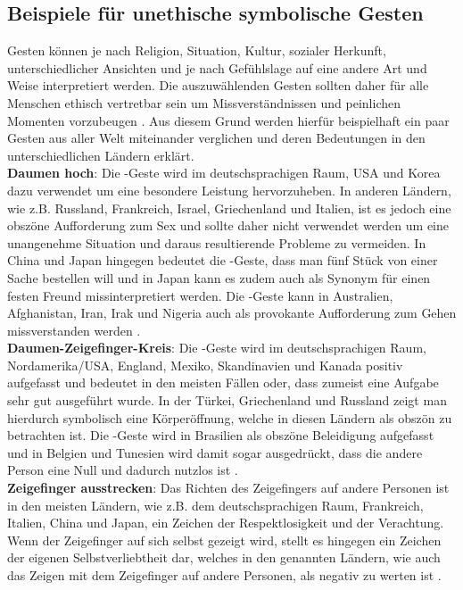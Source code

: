 \subsection{Beispiele für unethische symbolische Gesten}
Gesten können je nach Religion, Situation, Kultur, sozialer Herkunft, unterschiedlicher Ansichten und je nach Gefühlslage auf eine andere Art und Weise interpretiert werden. Die auszuwählenden Gesten sollten daher für alle Menschen ethisch vertretbar sein um Missverständnissen und peinlichen Momenten vorzubeugen \cite{gesten_liste_2020}. Aus diesem Grund werden hierfür beispielhaft ein paar Gesten aus aller Welt miteinander verglichen und deren Bedeutungen in den unterschiedlichen Ländern erklärt.\\

\textbf{Daumen hoch}: Die -Geste wird im deutschsprachigen Raum, USA und Korea dazu verwendet um eine besondere Leistung hervorzuheben. In anderen Ländern, wie z.B. Russland, Frankreich, Israel, Griechenland und Italien, ist es jedoch eine obszöne Aufforderung zum Sex und sollte daher nicht verwendet werden um eine unangenehme Situation und daraus resultierende Probleme zu vermeiden. In China und Japan hingegen bedeutet die -Geste, dass man fünf Stück von einer Sache bestellen will und in Japan kann es zudem auch als Synonym für einen festen Freund missinterpretiert werden. Die -Geste kann in Australien, Afghanistan, Iran, Irak und Nigeria auch als provokante Aufforderung zum Gehen missverstanden werden \cite{handzeichen_gesten_2018}.\\

\textbf{Daumen-Zeigefinger-Kreis}: Die -Geste wird im deutschsprachigen Raum, Nordamerika/USA, England, Mexiko, Skandinavien und Kanada positiv aufgefasst und bedeutet in den meisten Fällen  oder, dass zumeist eine Aufgabe sehr gut ausgeführt wurde. In der Türkei, Griechenland und Russland zeigt man hierdurch symbolisch eine Körperöffnung, welche in diesen Ländern als obszön zu betrachten ist. Die -Geste wird in Brasilien als obszöne Beleidigung aufgefasst und in Belgien und Tunesien wird damit sogar ausgedrückt, dass die andere Person eine Null und dadurch nutzlos ist \cite{handzeichen_gesten_2018}.\\

\textbf{Zeigefinger ausstrecken}: Das Richten des Zeigefingers auf andere Personen ist in den meisten Ländern, wie z.B. dem deutschsprachigen Raum, Frankreich, Italien, China und Japan, ein Zeichen der Respektlosigkeit und der Verachtung. Wenn der Zeigefinger auf sich selbst gezeigt wird, stellt es hingegen ein Zeichen der eigenen Selbstverliebtheit dar, welches in den genannten Ländern, wie auch das Zeigen mit dem Zeigefinger auf andere Personen, als negativ zu werten ist \cite{gesten_vergleich_nodate}.\\

